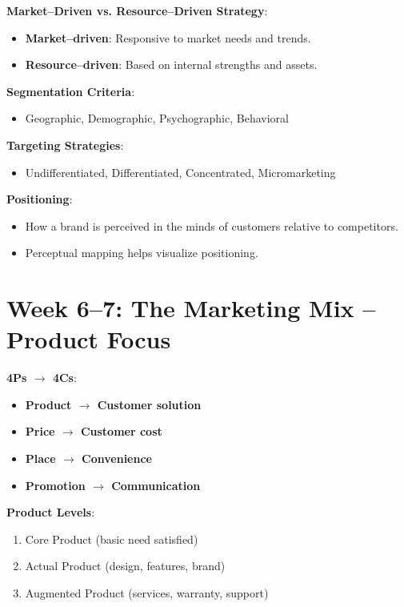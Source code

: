 \documentclass[12pt]{article}
\begin{document}
\textbf{Market--Driven vs. Resource--Driven Strategy}:
\begin{itemize}[leftmargin=*]
    \item \textbf{Market--driven}: Responsive to market needs and trends.
    \item \textbf{Resource--driven}: Based on internal strengths and assets.
\end{itemize}

\textbf{Segmentation Criteria}:
\begin{itemize}[leftmargin=*]
    \item Geographic, Demographic, Psychographic, Behavioral
\end{itemize}

\textbf{Targeting Strategies}:
\begin{itemize}[leftmargin=*]
    \item Undifferentiated, Differentiated, Concentrated, Micromarketing
\end{itemize}

\textbf{Positioning}:
\begin{itemize}[leftmargin=*]
    \item How a brand is perceived in the minds of customers relative to competitors.
    \item Perceptual mapping helps visualize positioning.
\end{itemize}

\section*{\faLeaf\hspace{0.5em} Week 6–7: The Marketing Mix – Product Focus}

\textbf{4Ps $\rightarrow$ 4Cs}:
\begin{itemize}[leftmargin=*]
    \item \textbf{Product $\rightarrow$ Customer solution}
    \item \textbf{Price $\rightarrow$ Customer cost}
    \item \textbf{Place $\rightarrow$ Convenience}
    \item \textbf{Promotion $\rightarrow$ Communication}
\end{itemize}

\textbf{Product Levels}:
\begin{enumerate}[leftmargin=*]
    \item Core Product (basic need satisfied)
    \item Actual Product (design, features, brand)
    \item Augmented Product (services, warranty, support)
\end{enumerate}
\end{document}
